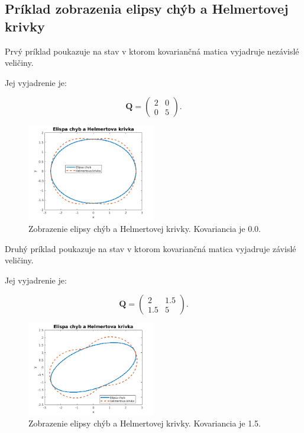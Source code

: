 \newpage
\subsection{Príklad zobrazenia elipsy chýb a Helmertovej krivky}

Prvý príklad poukazuje na stav v ktorom kovariančná matica vyjadruje nezávislé veličiny.

Jej vyjadrenie je: 

\begin{equation}
\mathbf{Q}=
\begin{pmatrix}
 2 & 0  \\
 0 & 5
\end{pmatrix}.
\end{equation}

\begin{figure}[ht!]
\begin{center}
\includegraphics[width=0.5\textwidth]{FIG/s2-5cov0-0.png}
\end{center}
\caption{Zobrazenie elipsy chýb a Helmertovej krivky. Kovariancia je 0.0.}
\end{figure}

Druhý príklad poukazuje na stav v ktorom kovariančná matica vyjadruje závislé veličiny.

Jej vyjadrenie je: 

\begin{equation}
\mathbf{Q}=
\begin{pmatrix} 
  2 & 1.5  \\
1.5 & 5 
\end{pmatrix}.
\end{equation}

\begin{figure}[ht!]
\begin{center}
\includegraphics[width=0.5\textwidth]{FIG/s2-5cov1.5-1.5.png}
\end{center}
\caption{Zobrazenie elipsy chýb a Helmertovej krivky. Kovariancia je 1.5.}
\end{figure}


